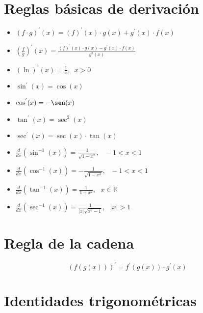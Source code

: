 \documentclass[twoside,landscape,letterpaper,twocolumn,13pt]{book}
\begin{document}
\pagestyle{empty} %

\section*{Reglas básicas de derivación}

\begin{itemize}
    \item $(f\cdot g)^{'}(x)  = (f)^{'}(x) \cdot g(x) + g^{'}(x)  \cdot f(x)   $
    \item $\displaystyle{\left( \frac{f}{g} \right)}^{'}(x) =\displaystyle{\frac{ (f)^{'}(x) \cdot g(x) - g^{'}(x)  \cdot f(x)}{g^{2}(x)}}$
    \item $(\ln)^{'}(x) = \displaystyle{\frac{1}{x}}, \,\,\, x > 0 $
    \item $\sin^{'}(x) = \cos(x)$
    \item $\cos^{'}(x) = -\sen(x)$
    \item $\tan^{'}(x) = \sec^{2}(x)$
    \item $\sec^{'}(x) = \sec(x) \cdot \tan(x)$
    \item $\displaystyle{\frac{d}{dx}(\sin^{-1}(x))}= \displaystyle{\frac{1}{\sqrt{1-x^{2}}}, \,\,\,\, -1 <  x < 1 }$
    \item $\displaystyle{\frac{d}{dx}(\cos^{-1}(x))}= \displaystyle{- \frac{1}{\sqrt{1-x^{2}}}, \,\,\,\, -1 <  x < 1 }$

    \item $\displaystyle{\frac{d}{dx}(\tan^{-1}(x))} = \displaystyle{\frac{1}{1+x^{2}}, \,\,\,\, x \in \mathbb{R}}$
    
    \item $\displaystyle{\frac{d}{dx}(\sec^{-1}(x))} = \displaystyle{\frac{1}{|x| \sqrt{x^{2} - 1}}, \,\,\,\, |x| > 1}$
    
\end{itemize}

\section*{Regla de la cadena}
\begin{equation}
(f(g(x)))^{'} =\displaystyle{ f^{'}(g(x)) \cdot g^{'}(x)}
\end{equation}


\section*{Identidades trigonométricas}
\end{document}
